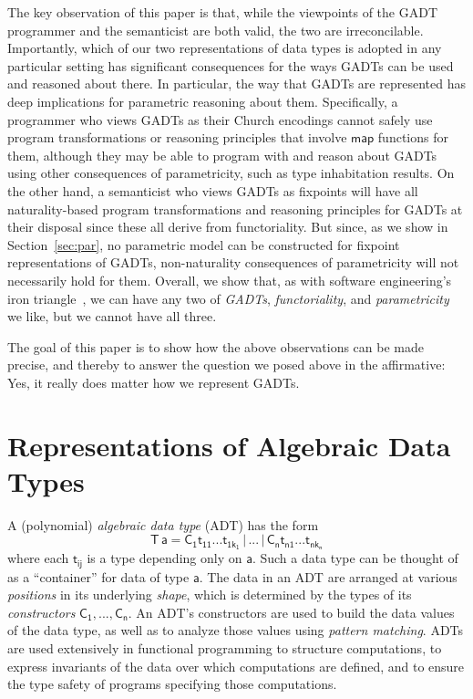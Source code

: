 \documentclass[submission,copyright,creativecommons]{eptcs}
\begin{document}
The key observation of this paper is that, while the viewpoints of the
GADT programmer and the semanticist are both valid, the two are
irreconcilable. Importantly, which of our two representations of data
types is adopted in any particular setting has significant
consequences for the ways GADTs can be used and reasoned about
there. In particular, the way that GADTs are represented has deep
implications for parametric reasoning about them. Specifically, a
programmer who views GADTs as their Church encodings cannot safely use
program transformations or reasoning principles that involve
$\mathsf{map}$ functions for them, although they may be able to
program with and reason about GADTs using other consequences of
parametricity, such as type inhabitation results. On the other hand, a
semanticist who views GADTs as fixpoints will have all
naturality-based program transformations and reasoning principles for
GADTs at their disposal since these all derive from functoriality. But
since, as we show in Section~\ref{sec:par}, no parametric model can be
constructed for fixpoint representations of GADTs, non-naturality
consequences of parametricity will not necessarily hold for them.
Overall, we show that, as with software engineering's iron
triangle~\cite{iron-triangle}, we can have any two of {\em GADTs},
{\em functoriality}, and {\em parametricity} we like, but we cannot
have all three.

The goal of this paper is to show how the above observations can be
made precise, and thereby to answer the question we posed above in the
affirmative: Yes, it really does matter how we represent GADTs.

\section{Representations of Algebraic Data Types}\label{sec:adts}

A (polynomial) {\em algebraic data type} (ADT) has the form
\[\mathsf{T\,a} = \mathsf{C_1 t_{11}}...\mathsf{t_{1k_1}}\, |\, ...\, |\,
\mathsf{C_n t_{n1}}...\mathsf{t_{nk_n}}\] where each $\mathsf{t_{ij}}$
is a type depending only on $\mathsf{a}$. Such a data type can be
thought of as a ``container'' for data of type $\mathsf{a}$. The data
in an ADT are arranged at various {\em positions} in its underlying
{\em shape}, which is determined by the types of its {\em
  constructors} $\mathsf{C_1},...,\mathsf{C_n}$. An ADT's constructors
are used to build the data values of the data type, as well as to
analyze those values using {\em pattern matching}. ADTs are used
extensively in functional programming to structure computations, to
express invariants of the data over which computations are defined,
and to ensure the type safety of programs specifying those
computations.
\end{document}
